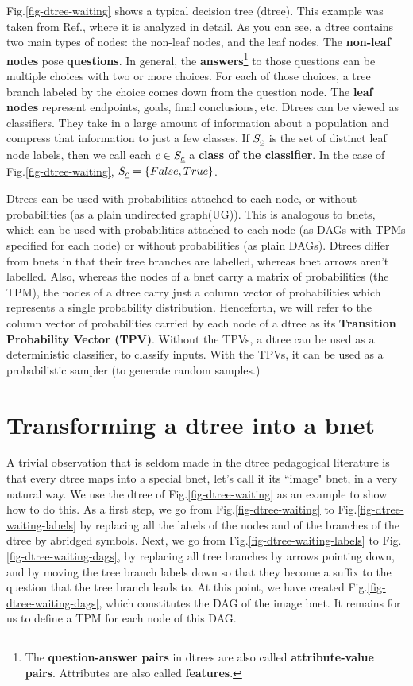 Fig.\ref{fig-dtree-waiting}
shows a typical decision tree (dtree).
This example was taken
from Ref.\cite{stu-nor-book},
where it is analyzed
in detail.
As you can see,
a dtree contains two main types
of nodes: the non-leaf nodes,
and the leaf nodes.
The {\bf non-leaf nodes} pose
{\bf questions}. In general,
the {\bf answers}\footnote
{The {\bf question-answer pairs}
in dtrees are
also called
{\bf attribute-value pairs}.
Attributes are also
called {\bf features}.}
 to those
questions can
be multiple choices with
two or more choices.
For each of those choices,
a tree branch labeled by the choice
 comes down from the 
question node.
The {\bf leaf nodes} represent
endpoints, goals, final
conclusions, etc.
Dtrees can be viewed
as classifiers. They
take in a large amount 
of information about a population 
and compress that information
to just a few classes.
If $S_{\underline{c}}$ is the 
set of distinct leaf node labels,
then we call each
$c\in S_{\underline{c}}$
a  {\bf class of the classifier}.
In the case of
Fig.\ref{fig-dtree-waiting},
$S_{\underline{c}}=\{False, True\}$.

Dtrees can be used 
with
probabilities attached to each node, or without
probabilities
(as a
plain undirected graph(UG)).
This is analogous to bnets,
which can be used with
probabilities attached to each node
 (as DAGs with
TPMs specified for each node) or without
probabilities (as plain
DAGs).
Dtrees differ 
from bnets in that
their tree branches 
are labelled, whereas bnet arrows
 aren't labelled.
Also,
whereas the nodes of
a bnet carry a matrix of 
probabilities (the TPM),
the nodes of a dtree carry
just a column vector
of probabilities
which represents
a single 
probability distribution.
Henceforth,
we will refer to
the column vector
of probabilities
carried by each node of a dtree
as its {\bf Transition
Probability Vector (TPV)}.
Without the TPVs,
a dtree can be used 
as a deterministic classifier,
to classify inputs.
With the TPVs,
it can be used as a 
probabilistic sampler (to generate
random samples.)

\section{Transforming a dtree into a bnet}
A trivial 
observation
that is seldom made
in the dtree pedagogical literature
is that every dtree 
maps into a special bnet, 
let's call it
its ``image" bnet,
in a very natural way.
We use the dtree
of Fig.\ref{fig-dtree-waiting}
as an example to show 
how to do this. As 
a first 
step,
we go from
Fig.\ref{fig-dtree-waiting}
to
Fig.\ref{fig-dtree-waiting-labels}
by
replacing
all the labels of the
nodes and of the branches of
the dtree 
by abridged symbols. 
Next, we go 
from Fig.\ref{fig-dtree-waiting-labels}
to Fig.\ref{fig-dtree-waiting-dags},
by replacing all tree branches 
by arrows pointing down,
 and by
moving the tree branch labels 
down so that they
become a suffix to the question 
that the tree branch leads to.
At this point,
we have created
Fig.\ref{fig-dtree-waiting-dags},
which constitutes
the DAG of the image bnet.
It remains for us to define
a TPM for each node
of this DAG.

